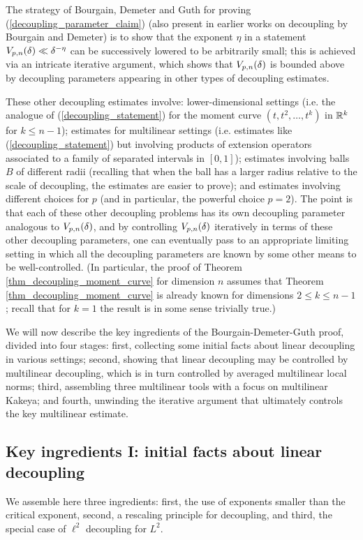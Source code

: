 \documentclass[brochure,english,12pt]{bourbaki}%
\begin{document}
 The strategy of Bourgain, Demeter and Guth for proving (\ref{decoupling_parameter_claim}) (also present in earlier works on decoupling by Bourgain and Demeter) is to show that the exponent $\eta$ in a statement $V_{p,n}(\delta) \ll \delta^{-\eta}$ can be successively lowered to be arbitrarily small; this is achieved via an intricate iterative argument, which shows that $V_{p,n}(\delta)$ is bounded above by decoupling parameters appearing in other types of decoupling estimates. 
 
 These other decoupling estimates involve: lower-dimensional settings (i.e. the analogue of (\ref{decoupling_statement}) for the moment curve $(t,t^2,\ldots,t^k)$ in $\mathbb{R}^k$ for $ k  \leq n-1$); estimates for multilinear settings (i.e. estimates like (\ref{decoupling_statement}) but involving products of extension operators associated to a family of separated intervals in $[0,1]$); estimates involving balls $B$  of different radii (recalling that when the ball has a larger radius relative to the scale of decoupling, the estimates are easier to prove); and estimates involving different choices for $p$ (and in particular, the powerful choice $p=2$). The point is that each of these other decoupling problems has its own decoupling parameter analogous to $V_{p,n}(\delta)$, and by controlling $V_{p,n}(\delta)$ iteratively in terms of these other decoupling parameters, one can eventually pass to an appropriate limiting setting in which all the decoupling parameters are known by some other means to be well-controlled. (In particular, the proof of Theorem \ref{thm_decoupling_moment_curve}  for dimension $n$ assumes that Theorem \ref{thm_decoupling_moment_curve} is already known for dimensions $2 \leq k \leq n-1$; recall that for $k=1$ the result is in some sense trivially true.)
 
  We will now describe  the key ingredients of the Bourgain-Demeter-Guth proof, divided into four stages: first, collecting some initial facts about linear decoupling in various settings; second, showing that linear decoupling may be controlled by multilinear decoupling, which is in turn controlled by averaged multilinear local norms; third, assembling three multilinear tools with a focus on multilinear Kakeya; and fourth, unwinding the iterative argument that ultimately controls the key multilinear estimate.
 
 
 \subsection{Key ingredients I:  initial facts about linear decoupling}
We assemble here three ingredients: first, the use of exponents smaller than the critical exponent, second, a rescaling principle for decoupling, and third, the special case of $\ell^2$ decoupling for $L^2$.
 
\end{document}
